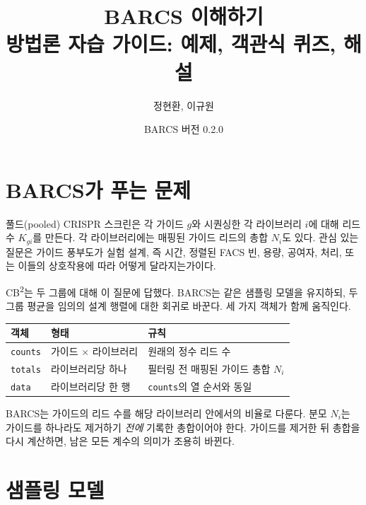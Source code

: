 \documentclass[11pt]{article}
\title{\textbf{BARCS 이해하기}\\[4pt]
\large 방법론 자습 가이드: 예제, 객관식 퀴즈, 해설}
\author{정현환, 이규원}
\date{BARCS 버전 0.2.0}
\begin{document}
\sloppy
\maketitle
\tableofcontents
\newpage

\section{BARCS가 푸는 문제}

풀드(pooled) CRISPR 스크린은 각 가이드 $g$와 시퀀싱한 각 라이브러리 $i$에
대해 리드 수 $K_{gi}$를 만든다. 각 라이브러리에는 매핑된 가이드 리드의 총합
$N_i$도 있다. 관심 있는 질문은 가이드 풍부도가 실험 설계, 즉 시간, 정렬된
FACS 빈, 용량, 공여자, 처리, 또는 이들의 상호작용에 따라 어떻게 달라지는가이다.

CB\textsuperscript{2}는 두 그룹에 대해 이 질문에 답했다. BARCS는 같은 샘플링
모델을 유지하되, 두 그룹 평균을 임의의 설계 행렬에 대한 회귀로 바꾼다. 세 가지
객체가 함께 움직인다.

\begin{center}
\begin{tabular}{lll}
\toprule
객체 & 형태 & 규칙\\
\midrule
\texttt{counts} & 가이드 $\times$ 라이브러리 & 원래의 정수 리드 수\\
\texttt{totals} & 라이브러리당 하나 & 필터링 전 매핑된 가이드 총합 $N_i$\\
\texttt{data} & 라이브러리당 한 행 & \texttt{counts}의 열 순서와 동일\\
\bottomrule
\end{tabular}
\end{center}

\begin{keyidea}
BARCS는 가이드의 리드 수를 해당 라이브러리 안에서의 비율로 다룬다. 분모 $N_i$는
가이드를 하나라도 제거하기 \emph{전에} 기록한 총합이어야 한다. 가이드를 제거한 뒤
총합을 다시 계산하면, 남은 모든 계수의 의미가 조용히 바뀐다.
\end{keyidea}

\section{샘플링 모델}
\end{document}
